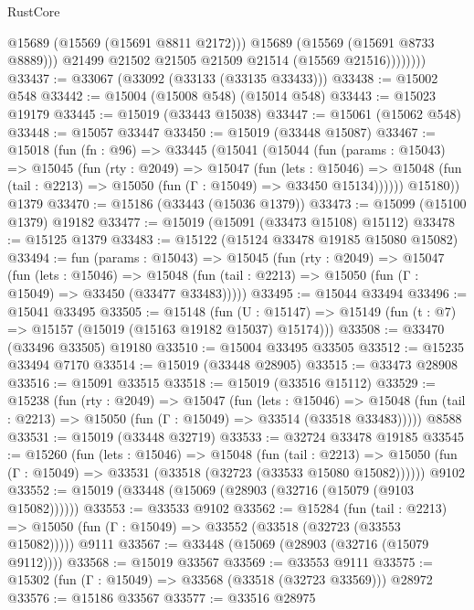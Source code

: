 \begin{lexlean}{RustCore}
\begin{coremodule}
                      @15689
                      (@15569 (@15691 @8811 @2172)))
                    @15689
                    (@15569 (@15691 @8733 @8889)))
                  @21499
                  @21502
                  @21505
                  @21509
                  @21514
                  (@15569 @21516))))))))
@33437 := @33067 (@33092 (@33133 (@33135 @33433)))
@33438 := @15002 @548
@33442 := @15004 (@15008 @548) (@15014 @548)
@33443 := @15023 @19179
@33445 := @15019 (@33443 @15038)
@33447 := @15061 (@15062 @548)
@33448 := @15057 @33447
@33450 := @15019 (@33448 @15087)
@33467 := @15018
    (fun (fn : @96) =>
    @33445
      (@15041
        (@15044
          (fun (params : @15043) =>
          @15045
            (fun (rty : @2049) =>
            @15047
              (fun (lets : @15046) =>
              @15048 (fun (tail : @2213) => @15050 (fun (Γ : @15049) => @33450 @15134))))))
        @15180))
    @1379
@33470 := @15186 (@33443 (@15036 @1379))
@33473 := @15099 (@15100 @1379) @19182
@33477 := @15019 (@15091 (@33473 @15108) @15112)
@33478 := @15125 @1379
@33483 := @15122 (@15124 @33478 @19185 @15080 @15082)
@33494 := fun (params : @15043) =>
  @15045
    (fun (rty : @2049) =>
    @15047
      (fun (lets : @15046) =>
      @15048 (fun (tail : @2213) => @15050 (fun (Γ : @15049) => @33450 (@33477 @33483)))))
@33495 := @15044 @33494
@33496 := @15041 @33495
@33505 := @15148
    (fun (U : @15147) => @15149 (fun (t : @7) => @15157 (@15019 (@15163 @19182 @15037) @15174)))
@33508 := @33470 (@33496 @33505) @19180
@33510 := @15004 @33495 @33505
@33512 := @15235 @33494 @7170
@33514 := @15019 (@33448 @28905)
@33515 := @33473 @28908
@33516 := @15091 @33515
@33518 := @15019 (@33516 @15112)
@33529 := @15238
    (fun (rty : @2049) =>
    @15047
      (fun (lets : @15046) =>
      @15048 (fun (tail : @2213) => @15050 (fun (Γ : @15049) => @33514 (@33518 @33483)))))
    @8588
@33531 := @15019 (@33448 @32719)
@33533 := @32724 @33478 @19185
@33545 := @15260
    (fun (lets : @15046) =>
    @15048
      (fun (tail : @2213) =>
      @15050 (fun (Γ : @15049) => @33531 (@33518 (@32723 (@33533 @15080 @15082))))))
    @9102
@33552 := @15019 (@33448 (@15069 (@28903 (@32716 (@15079 (@9103 @15082))))))
@33553 := @33533 @9102
@33562 := @15284
    (fun (tail : @2213) => @15050 (fun (Γ : @15049) => @33552 (@33518 (@32723 (@33553 @15082)))))
    @9111
@33567 := @33448 (@15069 (@28903 (@32716 (@15079 @9112))))
@33568 := @15019 @33567
@33569 := @33553 @9111
@33575 := @15302 (fun (Γ : @15049) => @33568 (@33518 (@32723 @33569))) @28972
@33576 := @15186 @33567
@33577 := @33516 @28975

\end{coremodule}
\end{lexlean}
